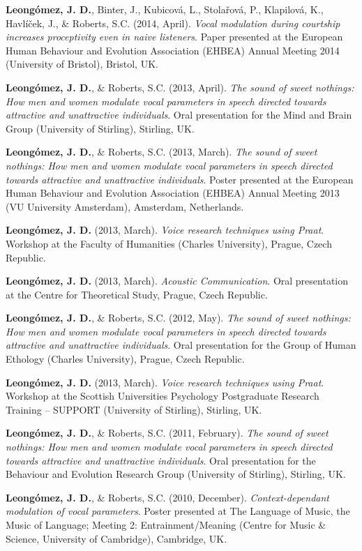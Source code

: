 \documentclass[11pt,a4paper,]{awesome-cv}
\begin{document}
\textbf{Leongómez, J. D.}, Binter, J., Kubicová, L., Stolařová, P.,
Klapilová, K., Havlíček, J., \& Roberts, S.C. (2014, April). \emph{Vocal
modulation during courtship increases proceptivity even in naive
listeners}. Paper presented at the European Human Behaviour and
Evolution Association (EHBEA) Annual Meeting 2014 (University of
Bristol), Bristol, UK.

\textbf{Leongómez, J. D.}, \& Roberts, S.C. (2013, April). \emph{The
sound of sweet nothings: How men and women modulate vocal parameters in
speech directed towards attractive and unattractive individuals}. Oral
presentation for the Mind and Brain Group (University of Stirling),
Stirling, UK.

\textbf{Leongómez, J. D.}, \& Roberts, S.C. (2013, March). \emph{The
sound of sweet nothings: How men and women modulate vocal parameters in
speech directed towards attractive and unattractive individuals}. Poster
presented at the European Human Behaviour and Evolution Association
(EHBEA) Annual Meeting 2013 (VU University Amsterdam), Amsterdam,
Netherlands.

\textbf{Leongómez, J. D.} (2013, March). \emph{Voice research techniques
using Praat}. Workshop at the Faculty of Humanities (Charles
University), Prague, Czech Republic.

\textbf{Leongómez, J. D.} (2013, March). \emph{Acoustic Communication}.
Oral presentation at the Centre for Theoretical Study, Prague, Czech
Republic.

\textbf{Leongómez, J. D.}, \& Roberts, S.C. (2012, May). \emph{The sound
of sweet nothings: How men and women modulate vocal parameters in speech
directed towards attractive and unattractive individuals}. Oral
presentation for the Group of Human Ethology (Charles University),
Prague, Czech Republic.

\textbf{Leongómez, J. D.} (2013, March). \emph{Voice research techniques
using Praat}. Workshop at the Scottish Universities Psychology
Postgraduate Research Training -- SUPPORT (University of Stirling),
Stirling, UK.

\textbf{Leongómez, J. D.}, \& Roberts, S.C. (2011, February). \emph{The
sound of sweet nothings: How men and women modulate vocal parameters in
speech directed towards attractive and unattractive individuals}. Oral
presentation for the Behaviour and Evolution Research Group (University
of Stirling), Stirling, UK.

\textbf{Leongómez, J. D.}, \& Roberts, S.C. (2010, December).
\emph{Context-dependant modulation of vocal parameters}. Poster
presented at The Language of Music, the Music of Language; Meeting 2:
Entrainment/Meaning (Centre for Music \& Science, University of
Cambridge), Cambridge, UK.
\end{document}
